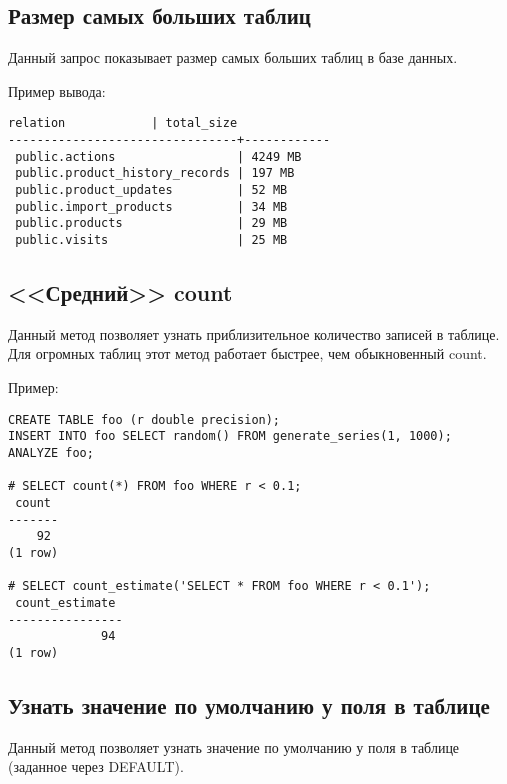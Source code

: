 \subsection{Размер самых больших таблиц}
Данный запрос показывает размер самых больших таблиц в базе данных.



Пример вывода:
\begin{lstlisting}[label=lst:snippets4,caption=Размер самых больших таблиц. Пример вывода]
            relation            | total_size
--------------------------------+------------
 public.actions                 | 4249 MB
 public.product_history_records | 197 MB
 public.product_updates         | 52 MB
 public.import_products         | 34 MB
 public.products                | 29 MB
 public.visits                  | 25 MB
\end{lstlisting}

\subsection{<<Средний>> count}
Данный метод позволяет узнать приблизительное количество записей в таблице.
Для огромных таблиц этот метод работает быстрее, чем обыкновенный count.



Пример:
\begin{lstlisting}[label=lst:snippets51,caption=<<Средний>> count. Пример]
CREATE TABLE foo (r double precision);
INSERT INTO foo SELECT random() FROM generate_series(1, 1000);
ANALYZE foo;

# SELECT count(*) FROM foo WHERE r < 0.1;
 count
-------
    92
(1 row)

# SELECT count_estimate('SELECT * FROM foo WHERE r < 0.1');
 count_estimate
----------------
             94
(1 row)
\end{lstlisting}

\subsection{Узнать значение по умолчанию у поля в таблице}
Данный метод позволяет узнать значение по умолчанию у поля в таблице (заданное через DEFAULT).




